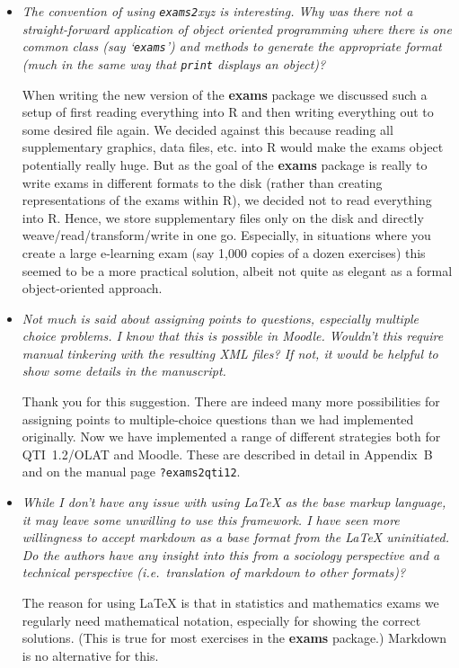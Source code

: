 \documentclass[a4paper]{article}
\begin{document}
\begin{itemize}

\item {\it
The convention of using \texttt{exams2}xyz is interesting. Why was there not a
straight-forward application of object oriented programming where there is
one common class (say `\texttt{exams}') and methods to generate the appropriate
format (much in the same way that \texttt{print} displays an object)?}

When writing the new version of the \textbf{exams} package we discussed such a setup
of first reading everything into R and then writing everything out to some
desired file again. We decided against this because reading all supplementary
graphics, data files, etc. into R would make the exams object potentially
really huge. But as the goal of the \textbf{exams} package is really to write exams
in different formats to the disk (rather than creating representations of the
exams within R), we decided not to read everything into R. Hence, we store
supplementary files only on the disk and directly weave/read/transform/write
in one go. Especially, in situations where you create a large e-learning exam
(say 1,000 copies of a dozen exercises) this seemed to be a more practical
solution, albeit not quite as elegant as a formal object-oriented approach.
 
\item {\it
Not much is said about assigning points to questions, especially
multiple choice problems. I know that this is possible in Moodle. Wouldn't
this require manual tinkering with the resulting XML files? If not, it
would be helpful to show some details in the manuscript.}

Thank you for this suggestion. There are indeed many more possibilities
for assigning points to multiple-choice questions than we had implemented
originally. Now we have implemented a range of different strategies
both for QTI~1.2/OLAT and Moodle. These are described in detail in
Appendix~B and on the manual page \verb|?exams2qti12|.


\item {\it
While I don't have any issue with using {\LaTeX} as the base markup
language, it may leave some unwilling to use this framework. I have seen
more willingness to accept markdown as a base format from the {\LaTeX}
uninitiated. Do the authors have any insight into this from a sociology
perspective and a technical perspective (i.e.\ translation of markdown to
other formats)?}

The reason for using {\LaTeX} is that in statistics and mathematics exams we
regularly need mathematical notation, especially for showing the correct
solutions. (This is true for most exercises in the \textbf{exams} package.)
Markdown is no alternative for this.


\end{itemize}
\end{document}
